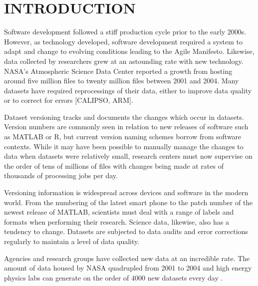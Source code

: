 
\chapter{INTRODUCTION}

Software development followed a stiff production cycle prior to the early 2000s.  However, as technology developed, software development required a system to adapt and change to evolving conditions leading to the Agile Manifesto.  Likewise, data collected by researchers grew at an astounding rate with new technology.  NASA's Atmospheric Science Data Center reported a growth from hosting around five million files to twenty million files between 2001 and 2004.  Many datasets have required reprocessings of their data, either to improve data quality or to correct for errors [CALIPSO, ARM].   

Dataset versioning tracks and documents the changes which occur in datasets.  Version numbers are commonly seen in relation to new releases of software such as MATLAB or R, but current version naming schemes borrow from software contexts.  While it may have been possible to manually manage the changes to data when datasets were relatively small, research centers must now supervise on the order of tens of millions of files with changes being made at rates of thousands of processing jobs per day.

Versioning information is widespread across devices and software in the modern world.  From the numbering of the latest smart phone to the patch number of the newest release of MATLAB, scientists must deal with a range of labels and formats when performing their research.  Science data, likewise, also has a tendency to change.  Datasets are subjected to data audits and error corrections regularly to maintain a level of data quality.

Agencies and research groups have collected new data at an incredible rate.  The amount of data housed by NASA quadrupled from 2001 to 2004 \cite{barkstromLibrary} and high energy physics labs can generate on the order of 4000 new datasets every day \cite{ATLAS}.

